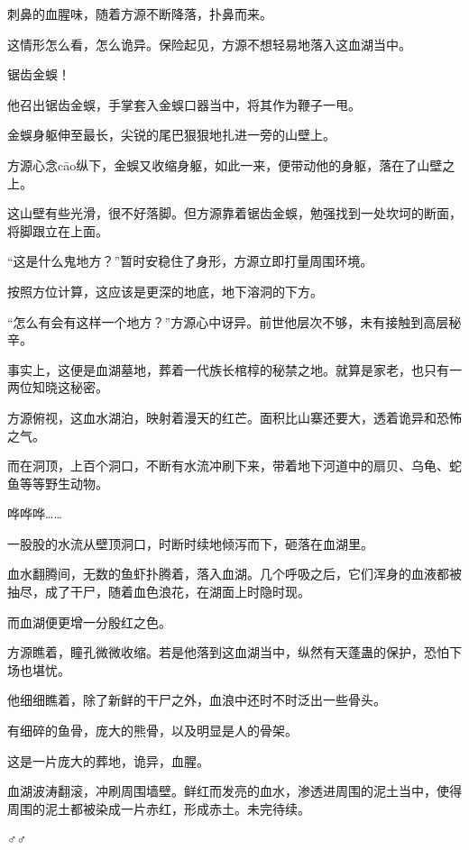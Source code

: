 \begin{this_body}
刺鼻的血腥味，随着方源不断降落，扑鼻而来。

这情形怎么看，怎么诡异。保险起见，方源不想轻易地落入这血湖当中。

锯齿金蜈！

他召出锯齿金蜈，手掌套入金蜈口器当中，将其作为鞭子一甩。

金蜈身躯伸至最长，尖锐的尾巴狠狠地扎进一旁的山壁上。

方源心念cāo纵下，金蜈又收缩身躯，如此一来，便带动他的身躯，落在了山壁之上。

这山壁有些光滑，很不好落脚。但方源靠着锯齿金蜈，勉强找到一处坎坷的断面，将脚跟立在上面。

“这是什么鬼地方？”暂时安稳住了身形，方源立即打量周围环境。

按照方位计算，这应该是更深的地底，地下溶洞的下方。

“怎么有会有这样一个地方？”方源心中讶异。前世他层次不够，未有接触到高层秘辛。

事实上，这便是血湖墓地，葬着一代族长棺椁的秘禁之地。就算是家老，也只有一两位知晓这秘密。

方源俯视，这血水湖泊，映射着漫天的红芒。面积比山寨还要大，透着诡异和恐怖之气。

而在洞顶，上百个洞口，不断有水流冲刷下来，带着地下河道中的扇贝、乌龟、蛇鱼等等野生动物。

哗哗哗……

一股股的水流从壁顶洞口，时断时续地倾泻而下，砸落在血湖里。

血水翻腾间，无数的鱼虾扑腾着，落入血湖。几个呼吸之后，它们浑身的血液都被抽尽，成了干尸，随着血色浪花，在湖面上时隐时现。

而血湖便更增一分殷红之色。

方源瞧着，瞳孔微微收缩。若是他落到这血湖当中，纵然有天蓬蛊的保护，恐怕下场也堪忧。

他细细瞧着，除了新鲜的干尸之外，血浪中还时不时泛出一些骨头。

有细碎的鱼骨，庞大的熊骨，以及明显是人的骨架。

这是一片庞大的葬地，诡异，血腥。

血湖波涛翻滚，冲刷周围墙壁。鲜红而发亮的血水，渗透进周围的泥土当中，使得周围的泥土都被染成一片赤红，形成赤土。未完待续。

♂♂

\end{this_body}

